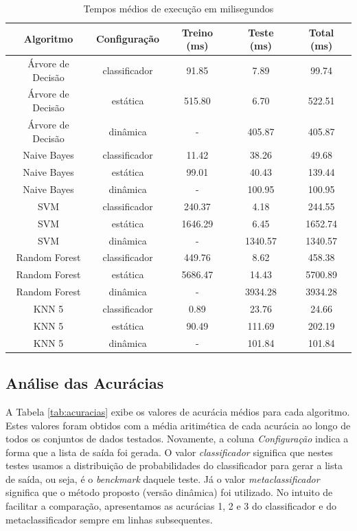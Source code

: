 \begin{table}[h!]
  \begin{center}
    \begin{tabular}{ccccc}
      \hline
      \textbf{Algoritmo} & \textbf{Configuração} & \textbf{Treino (ms)} & \textbf{Teste (ms)} & \textbf{Total (ms)}\\
      \hline

      Árvore de Decisão & classificador & 91.85 & 7.89 & 99.74\\
      Árvore de Decisão & estática & 515.80 & 6.70 & 522.51\\
      Árvore de Decisão & dinâmica & - & 405.87 & 405.87\\
      Naive Bayes &  classificador & 11.42 & 38.26 & 49.68\\
      Naive Bayes &  estática & 99.01 & 40.43 & 139.44\\
      Naive Bayes &  dinâmica & - & 100.95 & 100.95\\
      SVM & classificador & 240.37 & 4.18 & 244.55\\
      SVM & estática & 1646.29 & 6.45 & 1652.74\\
      SVM & dinâmica & - & 1340.57 & 1340.57\\
      Random Forest &  classificador & 449.76 & 8.62 & 458.38\\
      Random Forest &  estática & 5686.47 & 14.43 & 5700.89\\
      Random Forest &  dinâmica & - & 3934.28 & 3934.28\\
      KNN 5 & classificador & 0.89 & 23.76 & 24.66\\
      KNN 5 & estática  & 90.49 & 111.69  & 202.19\\
      KNN 5 & dinâmica  & - & 101.84 & 101.84\\


      \hline
    \end{tabular}
    \caption{Tempos médios de execução em milisegundos}
    \label{tab:tempostestes}
  \end{center}
\end{table}

\subsection{Análise das Acurácias}

A Tabela \ref{tab:acuracias} exibe os valores de acurácia médios para cada algoritmo. 
Estes valores foram obtidos com a média aritimética de cada acurácia ao longo de todos os conjuntos de dados testados.
Novamente, a coluna \textit{Configuração} indica a forma que a lista de saída foi gerada. 
O valor \textit{classificador} significa que nestes testes usamos a distribuição de probabilidades do classificador para gerar a lista de saída, ou seja, é o \textit{benckmark} daquele teste.
Já o valor \textit{metaclassificador} significa que o método proposto (versão dinâmica) foi utilizado.
No intuito de facilitar a comparação, apresentamos as acurácias 1, 2 e 3 do classificador e do metaclassificador sempre em linhas subsequentes.

